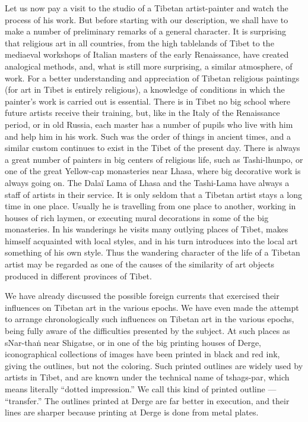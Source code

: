 \documentclass[a4paper, 12pt, oneside]{article}
\begin{document}
Let us now pay a visit to the studio of a Tibetan artist-painter and watch the process of his work. But before starting with our description, we shall have to make a number of preliminary remarks of a general character. It is surprising that religious art in all countries, from the high tablelands of Tibet to the mediaeval workshops of Italian masters of the early Renaissance, have created analogical methods, and, what is still more surprising, a similar atmosphere, of work. For a better understanding and appreciation of Tibetan religious paintings (for art in Tibet is entirely religious), a knowledge of conditions in which the painter's work is carried out is essential. There is in Tibet no big school where future artists receive their training, but, like in the Italy of the Renaissance period, or in old Russia, each master has a number of pupils who live with him and help him in his work. Such was the order of things in ancient times, and a similar custom continues to exist in the Tibet of the present day. There is always a great number of painters in big centers of religious life, such as Tashi-lhunpo, or one of the great Yellow-cap monasteries near Lhasa, where big decorative work is always going on. The Dalaï Lama of Lhasa and the Tashi-Lama have always a staff of artists in their service. It is only seldom that a Tibetan artist stays a long time in one place. Usually he is travelling from one place to another, working in houses of rich laymen, or executing mural decorations in some of the big monasteries. In his wanderings he visits many outlying places of Tibet, makes himself acquainted with local styles, and in his turn introduces into the local art something of his own style. Thus the wandering character of the life of a Tibetan artist may be regarded as one of the causes of the similarity of art objects produced in different provinces of Tibet.

We have already discussed the possible foreign currents that exercised their influences on Tibetan art in the various epochs. We have even made the attempt to arrange chronologically such influences on Tibetan art in the various epochs, being fully aware of the difficulties presented by the subject. At such places as sNar-tha\.{n} near Shigatse, or in one of the big printing houses of Derge, iconographical collections of images have been printed in black and red ink, giving the outlines, but not the coloring. Such printed outlines are widely used by artists in Tibet, and are known under the technical name of tshags-par, which means literally ``dotted impression.'' We call this kind of printed outline --- ``transfer.'' The outlines printed at Derge are far better in execution, and their lines are sharper because printing at Derge is done from metal plates.
\end{document}
